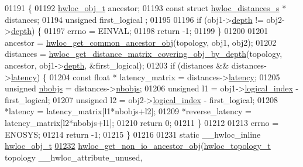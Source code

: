 \begin{DoxyCode}
01191 \{
01192   \hyperlink{a00016}{hwloc_obj_t} ancestor;
01193   \textcolor{keyword}{const} \textcolor{keyword}{struct }\hyperlink{a00014}{hwloc_distances_s} * distances;
01194   \textcolor{keywordtype}{unsigned} first\_logical ;
01195 
01196   \textcolor{keywordflow}{if} (obj1->\hyperlink{a00016_a9d82690370275d42d652eccdea5d3ee5}{depth} != obj2->\hyperlink{a00016_a9d82690370275d42d652eccdea5d3ee5}{depth}) \{
01197     errno = EINVAL;
01198     \textcolor{keywordflow}{return} -1;
01199   \}
01200 
01201   ancestor = \hyperlink{a00053_ga52a334f17c6b5b409d5cc6bb4ab8a2ab}{hwloc_get_common_ancestor_obj}(topology, obj1, obj2);
01202   distances = \hyperlink{a00063_ga186ac2711b98a12cf46d58cd005fbb51}{hwloc_get_distance_matrix_covering_obj_by_depth}(topology, ancestor,
       obj1->\hyperlink{a00016_a9d82690370275d42d652eccdea5d3ee5}{depth}, &first\_logical);
01203   \textcolor{keywordflow}{if} (distances && distances->\hyperlink{a00014_a0f70f48d1bfb18e5e2008825da2967c9}{latency}) \{
01204     \textcolor{keyword}{const} \textcolor{keywordtype}{float} * latency\_matrix = distances->\hyperlink{a00014_a0f70f48d1bfb18e5e2008825da2967c9}{latency};
01205     \textcolor{keywordtype}{unsigned} \hyperlink{a00014_a4ca2af858cebbce7324ec49903d09474}{nbobjs} = distances->\hyperlink{a00014_a4ca2af858cebbce7324ec49903d09474}{nbobjs};
01206     \textcolor{keywordtype}{unsigned} l1 = obj1->\hyperlink{a00016_a0d07fb7b8935e137c94d75a3eb492ae9}{logical_index} - first\_logical;
01207     \textcolor{keywordtype}{unsigned} l2 = obj2->\hyperlink{a00016_a0d07fb7b8935e137c94d75a3eb492ae9}{logical_index} - first\_logical;
01208     *latency = latency\_matrix[l1*nbobjs+l2];
01209     *reverse\_latency = latency\_matrix[l2*nbobjs+l1];
01210     \textcolor{keywordflow}{return} 0;
01211   \}
01212 
01213   errno = ENOSYS;
01214   \textcolor{keywordflow}{return} -1;
01215 \}
01216 
01231 \textcolor{keyword}{static} \_\_hwloc\_inline \hyperlink{a00016}{hwloc_obj_t}
\hypertarget{a00031_source_l01232}{}\hyperlink{a00064_ga3603275746a8792e54415d79763aa9e9}{01232} \hyperlink{a00064_ga3603275746a8792e54415d79763aa9e9}{hwloc_get_non_io_ancestor_obj}(\hyperlink{a00039_ga9d1e76ee15a7dee158b786c30b6a6e38}{hwloc_topology_t} topology \_\_hwloc\_attribute\_unused,
      

\end{DoxyCode}
